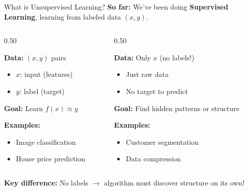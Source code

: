 \begin{frame}{What is Unsupervised Learning?}
\textbf{So far:} We've been doing \textbf{Supervised Learning}, learning from labeled data $(x, y)$.

\vspace{1em}
\begin{columns}[c]
\begin{column}{0.50\textwidth}
\begin{tcolorbox}[colback=blue!5, colframe=blue!50, title=\textbf{Supervised Learning}]
\textbf{Data:} $(x, y)$ pairs
\begin{itemize}
\item $x$: input (features)
\item $y$: label (target)
\end{itemize}
\vspace{0.3em}
\textbf{Goal:} Learn $f(x) \approx y$

\textbf{Examples:}
\begin{itemize}
\item Image classification
\item House price prediction
\end{itemize}
\end{tcolorbox}
\end{column}

\begin{column}{0.50\textwidth}
\begin{tcolorbox}[colback=green!5, colframe=green!50!black, title=\textbf{Unsupervised Learning}]
\textbf{Data:} Only $x$ (no labels!)
\begin{itemize}
\item Just raw data
\item No target to predict
\end{itemize}
\vspace{0.3em}
\textbf{Goal:} Find hidden patterns or structure

\textbf{Examples:}
\begin{itemize}
\item Customer segmentation
\item Data compression
\end{itemize}
\end{tcolorbox}
\end{column}
\end{columns}

\vspace{1em}
\centering
\textbf{Key difference:} No labels $\rightarrow$ algorithm must discover structure on its own!
\end{frame}

